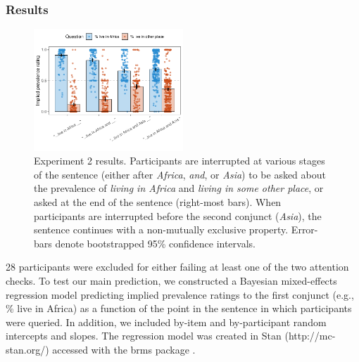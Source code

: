 \documentclass[10pt,letterpaper]{article}
\newcommand{\mh}[1]{{\textcolor{Blue}{[mh: #1]}}}
\begin{document}
 \subsubsection{Results}
 
\begin{figure}[h]
  \centering
    \includegraphics[width=0.5\textwidth]{expt3_summary}
    \vspace{-1cm}
  \caption{Experiment 2 results. Participants are interrupted at various stages of the sentence (either after \emph{Africa}, \emph{and}, or \emph{Asia}) to be asked about the prevalence of \emph{living in Africa} and \emph{living in some other place}, or asked at the end of the sentence (right-most bars). When participants are interrupted before the second conjunct (\emph{Asia}), the sentence continues with a non-mutually exclusive property. Error-bars denote bootstrapped 95\% confidence intervals.}
    \label{fig:expt3}
        \vspace{-0.5cm}
  \end{figure}
  
% 

28 participants were excluded for either failing at least one of the two attention checks.
To test our main prediction, we constructed a Bayesian mixed-effects regression model predicting implied prevalence ratings to the first conjunct (e.g., \% live in Africa) as a function of the point in the sentence in which participants were queried. 
In addition, we included by-item and by-participant random intercepts and slopes. 
The regression model was created in Stan (http://mc-stan.org/) accessed with the brms package \cite{burkner_brms_2017}.
\end{document}
